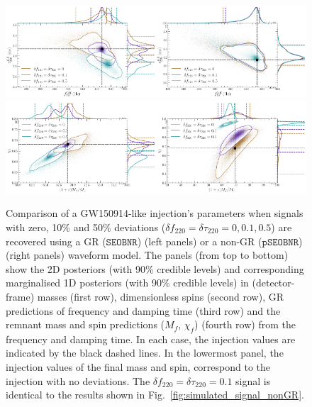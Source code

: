 \documentclass[twocolumn,prd,aps,superscriptaddress,preprintnumbers,tightenlines,showpacs,nofootinbib,eqsecnum,amsfonts,amsmath]{revtex4-1}
\newcommand{\abhi}[1]{\textcolor{Emerald}{#1}}
\newcommand{\df}[1]{\delta f_{\text{#1}}}
\newcommand{\dtau}[1]{\delta \tau_{\text{#1}}}
\newcommand{\pSEOB}{\texttt{pSEOBNR}}
\newcommand{\SEOB}{\texttt{SEOBNR}}
\begin{document}
\begin{figure}
        \includegraphics[width=0.5\textwidth]{figures/GW150914_simulated_signal_0p0_0p1_0p5_gr_fgrtaugr.png}\includegraphics[width=0.5\textwidth]{figures/GW150914_simulated_signal_0p0_0p1_0p5_ngr_fgrtaugr.png}
        \includegraphics[width=0.5\textwidth]{figures/GW150914_simulated_signal_0p0_0p1_0p5_gr_Mfaf.png}\includegraphics[width=0.5\textwidth]{figures/GW150914_simulated_signal_0p0_0p1_0p5_ngr_Mfaf.png}
         \caption{Comparison of a GW150914-like injection's parameters when signals with zero, 10\% and 50\% deviations ($\df{220} = \dtau{220} = 0, 0.1, 0.5$) are recovered using a GR ($\SEOB$) (left panels) or a non-GR ($\pSEOB$) (right panels) waveform model. The panels (from top to bottom) show the 2D posteriors (with 90\% credible levels) and corresponding marginalised 1D posteriors (with 90\% credible levels) in (detector-frame) masses (first row), dimensionless spins (second row), GR predictions of frequency and damping time (third row) and the remnant mass and spin predictions ($M_f$, $\chi_f$) \abhi{(fourth row)} from the frequency and damping time. In each case, the injection values are indicated by the black dashed lines. In the lowermost panel, the injection values of the final mass and spin, correspond to the injection with no deviations. The $\df{220} = \dtau{220} = 0.1$ signal is identical to the results shown in Fig.~\ref{fig:simulated_signal_nonGR}.}
        \label{fig:gr_ngr_comparison}
\end{figure}
\end{document}
